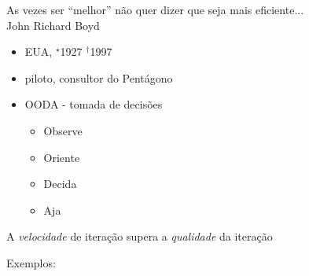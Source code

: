 \begin{frame}[label=graduacao]
	As vezes ser ``melhor'' não quer dizer que seja mais eficiente...
	\pause\\\vfill
	John Richard Boyd
	\begin{itemize}
		\item EUA, $^{\star}$1927 $^{\dagger}$1997
		\item piloto, consultor do Pentágono
		\item OODA - tomada de decisões \pause
			\begin{itemize}
				\item Observe
				\item Oriente
				\item Decida
				\item Aja
			\end{itemize}
	\end{itemize}
	
	\pause%
	\begin{beamerboxesrounded}{}
		A \emph{velocidade} de iteração  supera\uncover<3->{r} 
		a \emph{qualidade} da iteração
	\end{beamerboxesrounded}

	Exemplos:\pause
	\begin{columns}[T]
	\end{columns}
\end{frame}